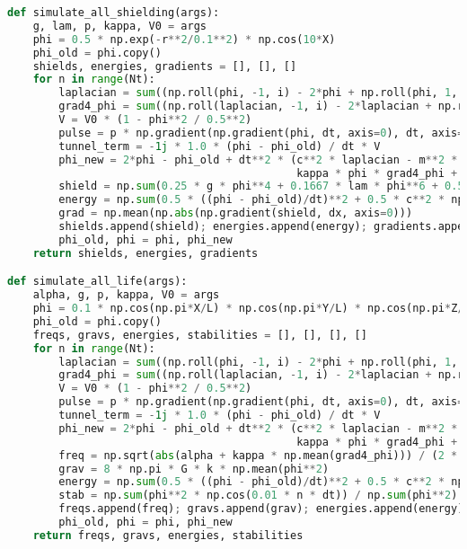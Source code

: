 \documentclass[11pt]{article}
\begin{document}
\begin{lstlisting}[language=Python, caption={Fluxonic Gravitational Vehicle Simulation}, label={lst:fgv}]
def simulate_all_shielding(args):
    g, lam, p, kappa, V0 = args
    phi = 0.5 * np.exp(-r**2/0.1**2) * np.cos(10*X)
    phi_old = phi.copy()
    shields, energies, gradients = [], [], []
    for n in range(Nt):
        laplacian = sum((np.roll(phi, -1, i) - 2*phi + np.roll(phi, 1, i)) / dx**2 for i in range(3))
        grad4_phi = sum((np.roll(laplacian, -1, i) - 2*laplacian + np.roll(laplacian, 1, i)) / dx**2 for i in range(3))
        V = V0 * (1 - phi**2 / 0.5**2)
        pulse = p * np.gradient(np.gradient(phi, dt, axis=0), dt, axis=0) * np.cos(0.01 * n * dt)
        tunnel_term = -1j * 1.0 * (phi - phi_old) / dt * V
        phi_new = 2*phi - phi_old + dt**2 * (c**2 * laplacian - m**2 * phi - g * phi**3 - lam * phi**5 + 
                                             kappa * phi * grad4_phi + np.real(tunnel_term) + pulse - 8*np.pi*G*k*phi**2)
        shield = np.sum(0.25 * g * phi**4 + 0.1667 * lam * phi**6 + 0.5 * kappa * phi * laplacian**2 + V)
        energy = np.sum(0.5 * ((phi - phi_old)/dt)**2 + 0.5 * c**2 * np.sum(np.gradient(phi, dx)**2, axis=0))
        grad = np.mean(np.abs(np.gradient(shield, dx, axis=0)))
        shields.append(shield); energies.append(energy); gradients.append(grad)
        phi_old, phi = phi, phi_new
    return shields, energies, gradients

def simulate_all_life(args):
    alpha, g, p, kappa, V0 = args
    phi = 0.1 * np.cos(np.pi*X/L) * np.cos(np.pi*Y/L) * np.cos(np.pi*Z/L)
    phi_old = phi.copy()
    freqs, gravs, energies, stabilities = [], [], [], []
    for n in range(Nt):
        laplacian = sum((np.roll(phi, -1, i) - 2*phi + np.roll(phi, 1, i)) / dx**2 for i in range(3))
        grad4_phi = sum((np.roll(laplacian, -1, i) - 2*laplacian + np.roll(laplacian, 1, i)) / dx**2 for i in range(3))
        V = V0 * (1 - phi**2 / 0.5**2)
        pulse = p * np.gradient(np.gradient(phi, dt, axis=0), dt, axis=0) * np.cos(0.01 * n * dt)
        tunnel_term = -1j * 1.0 * (phi - phi_old) / dt * V
        phi_new = 2*phi - phi_old + dt**2 * (c**2 * laplacian - m**2 * phi - g * phi**3 + alpha * phi + 
                                             kappa * phi * grad4_phi + np.real(tunnel_term) + pulse - 8*np.pi*G*k*phi**2)
        freq = np.sqrt(abs(alpha + kappa * np.mean(grad4_phi))) / (2 * np.pi)
        grav = 8 * np.pi * G * k * np.mean(phi**2)
        energy = np.sum(0.5 * ((phi - phi_old)/dt)**2 + 0.5 * c**2 * np.sum(np.gradient(phi, dx)**2, axis=0))
        stab = np.sum(phi**2 * np.cos(0.01 * n * dt)) / np.sum(phi**2)
        freqs.append(freq); gravs.append(grav); energies.append(energy); stabilities.append(stab)
        phi_old, phi = phi, phi_new
    return freqs, gravs, energies, stabilities


\end{lstlisting}
\end{document}
